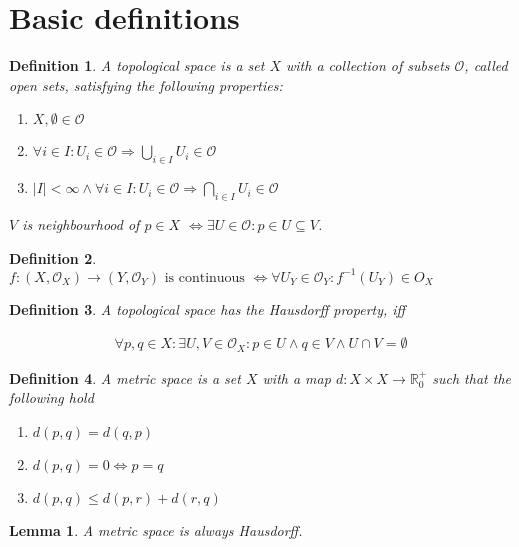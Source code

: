 \documentclass{scrartcl}
\newcommand{\R}{\mathbb R}
\newtheorem*{mydef}{Definition}
\newtheorem*{lemma}{Lemma}
\begin{document}
\section{Basic definitions}

\begin{mydef}
  A \emph{topological space} is a set $X$ with a collection of subsets $\mathcal O$, called \emph{open sets}, satisfying the following properties:
	
  \begin{enumerate}
    \item $X,\emptyset \in \mathcal O$
    \item $\forall i \in I: U_i \in \mathcal O \Rightarrow \bigcup_{i\in I} U_i \in \mathcal O$
    \item $|I|<\infty \land \forall i \in I: U_i \in \mathcal O \Rightarrow \bigcap_{i\in I} U_i \in \mathcal O$
  \end{enumerate}

  $V$ is \emph{neighbourhood} of $p \in X$ $\Leftrightarrow \exists U \in \mathcal O : p\in U \subseteq V$. 
\end{mydef}

\begin{mydef}
  $f:(X,\mathcal O_X) \rightarrow (Y,\mathcal O_Y) \text{ is continuous }\Leftrightarrow \forall U_Y \in \mathcal O_Y : f^{-1}(U_Y) \in O_X$
\end{mydef}

\begin{mydef}
  A topological space has the \emph{Hausdorff property}, iff
  
  \begin{align}
    \forall p,q\in X: \exists U,V \in \mathcal O_X: p \in U \land q \in V \land U\cap V = \emptyset
  \end{align}
\end{mydef}

\begin{mydef}
  A \emph{metric space} is a set $X$ with a map $d:X\times X \rightarrow \R^{+}_0$ such that the following hold

  \begin{enumerate}
  \item $d(p,q)=d(q,p)$
  \item $d(p,q)=0 \Leftrightarrow p=q$
  \item $d(p,q)\le d(p,r)+d(r,q)$
  \end{enumerate}
\end{mydef}

\begin{lemma}
  A metric space is always Hausdorff.
\end{lemma}
\end{document}
